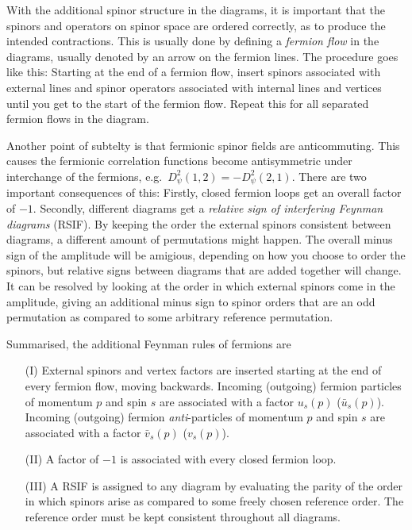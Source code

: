 \documentclass[../main.tex]{subfiles}
\begin{document}
With the additional spinor structure in the diagrams, it is important that the spinors and operators on spinor space are ordered correctly, as to produce the intended contractions.
This is usually done by defining a \emph{fermion flow} in the diagrams, usually denoted by an arrow on the fermion lines.
The procedure goes like this:
Starting at the end of a fermion flow, insert spinors associated with external lines and spinor operators associated with internal lines and vertices until you get to the start of the fermion flow.
Repeat this for all separated fermion flows in the diagram.

Another point of subtelty is that fermionic spinor fields are anticommuting.
This causes the fermionic correlation functions become antisymmetric under interchange of the fermions, e.g.\ \(D_\psi^2(1, 2) = -D_\psi^2(2, 1)\).
There are two important consequences of this:
Firstly, closed fermion loops get an overall factor of \(-1\).
Secondly, different diagrams get a \emph{relative sign of interfering Feynman diagrams} (RSIF).
By keeping the order the external spinors consistent between diagrams, a different amount of permutations might happen.
The overall minus sign of the amplitude will be amigious, depending on how you choose to order the spinors, but relative signs between diagrams that are added together will change.
It can be resolved by looking at the order in which external spinors come in the amplitude, giving an additional minus sign to spinor orders that are an odd permutation as compared to some arbitrary reference permutation.
\medskip

Summarised, the additional Feynman rules of fermions are
\begin{itemize}
  \item [(I)] External spinors and vertex factors are inserted starting at the end of every fermion flow, moving backwards. Incoming (outgoing) fermion particles of momentum \(p\) and spin \(s\) are associated with a factor \(u_s(p)\) (\(\bar{u}_s(p)\)). Incoming (outgoing) fermion \emph{anti}-particles of momentum \(p\) and spin \(s\) are associated with a factor \(\bar{v}_s(p)\) (\(v_s(p)\)).
  \item [(II)] A factor of \(-1\) is associated with every closed fermion loop.
  \item [(III)] A RSIF is assigned to any diagram by evaluating the parity of the order in which spinors arise as compared to some freely chosen reference order. The reference order must be kept consistent throughout all diagrams.
\end{itemize}
\medskip
\end{document}
